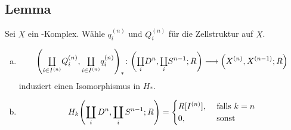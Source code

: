 \subsection{Lemma} %
\label{sub:125}
Sei $X$ ein \CW-Komplex. Wähle $q_i^{(n)}$ und $Q_i^{(n)}$ für die Zellstruktur auf $X$.
\begin{enumerate}[a)]
	\item 
	\[
		\enbrace*{{\textstyle\coprod\limits_{i \in I^{(n)}}} Q_i^{(n)}, {\textstyle\coprod\limits_{i \in I^{(n)}}} q_i^{(n)}}_* 
		\colon \enbrace*{{\textstyle\coprod\limits_i} D^n, {\textstyle\coprod\limits_i} S^{n-1};R}  \longrightarrow 
		\enbrace*{X^{(n)}, X^{(n-1)};R} 
	\]
	induziert einen Isomorphismus in $H_*$.
	\item \[
		H_k \enbrace*{\coprod_i D^n, \coprod_i S^{n-1};R} = \begin{cases}
			R[I^{(n)}], &\text{ falls }k=n\\
			0, & \text{ sonst}
		\end{cases}
	\] 
\end{enumerate}

